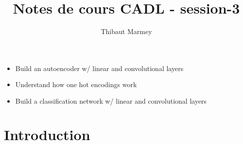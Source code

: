 \documentclass[12pt,a4paper]{article}
\author{Thibaut Marmey}
\title{Notes de cours CADL - session-3}
\begin{document}
	\maketitle

\begin{scriptsize} \begin{itemize}
\item Build an autoencoder w/ linear and convolutional layers
\item Understand how one hot encodings work
\item Build a classification network w/ linear and convolutional layers
\end{itemize}\end{scriptsize}

\begin{normalsize}
\tableofcontents
\end{normalsize}

\section{Introduction}
\end{document}

